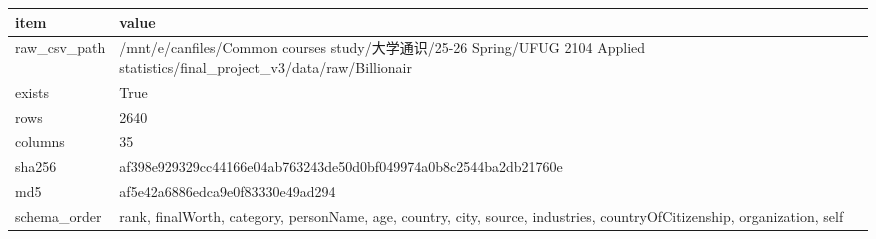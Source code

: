\begin{tabular}{ll}
\toprule
item & value \\
\midrule
raw\_csv\_path & /mnt/e/canfiles/Common courses study/大学通识/25-26 Spring/UFUG 2104 Applied statistics/final\_project\_v3/data/raw/Billionair \\
exists & True \\
rows & 2640 \\
columns & 35 \\
sha256 & af398e929329cc44166e04ab763243de50d0bf049974a0b8c2544ba2db21760e \\
md5 & af5e42a6886edca9e0f83330e49ad294 \\
schema\_order & rank, finalWorth, category, personName, age, country, city, source, industries, countryOfCitizenship, organization, self \\
\bottomrule
\end{tabular}
